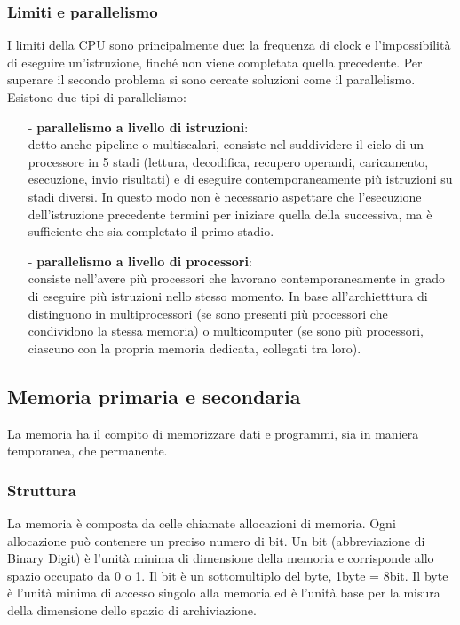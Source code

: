 \documentclass{article}
\begin{document}
\subsubsection*{Limiti e parallelismo}
I limiti della CPU sono principalmente due: la frequenza di clock e l'impossibilità di eseguire un'istruzione, finché
non viene completata quella precedente. Per superare il secondo problema si sono cercate soluzioni come il parallelismo.
Esistono due tipi di parallelismo:
\begin{itemize}[topsep=3pt, itemsep=0pt]
	\item[-] \textbf{parallelismo a livello di istruzioni}: \\ 
	detto anche pipeline o multiscalari, consiste nel suddividere il ciclo di un processore in 5 stadi (lettura, decodifica,
	recupero operandi, caricamento, esecuzione, invio risultati) e di eseguire contemporaneamente più istruzioni su stadi
	diversi. In questo modo non è necessario aspettare che l'esecuzione dell'istruzione	precedente termini per iniziare
	quella della successiva, ma è sufficiente che sia completato il primo stadio. 
	\item[-] \textbf{parallelismo a livello di processori}: \\
	consiste nell'avere più processori che lavorano contemporaneamente in grado di eseguire più istruzioni nello stesso momento.
	In base all'archietttura di distinguono in multiprocessori (se sono presenti più processori che condividono la stessa memoria)
	o multicomputer (se sono più processori, ciascuno con la propria memoria dedicata, collegati tra loro).
\end{itemize}

\subsection{Memoria primaria e secondaria}
La memoria ha il compito di memorizzare dati e programmi, sia in maniera temporanea, che permanente.

\subsubsection*{Struttura}
La memoria è composta da celle chiamate allocazioni di memoria. Ogni allocazione può contenere un preciso numero di bit.
Un bit (abbreviazione di Binary Digit) è l'unità minima di dimensione della memoria e corrisponde allo spazio occupato da 0 o 1.
Il bit è un sottomultiplo del byte, 1byte = 8bit. Il byte è l'unità minima di accesso singolo alla memoria ed è l'unità base 
per la misura della dimensione dello spazio di archiviazione.
\end{document}

